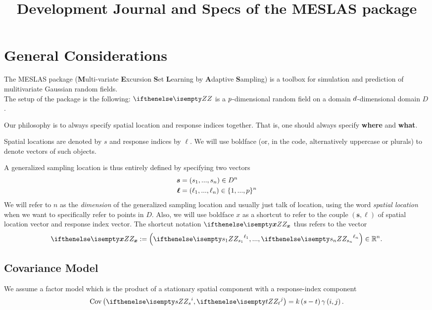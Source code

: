 \documentclass[a4paper,10pt]{article}
\title{Development Journal and Specs of the MESLAS package
}
\begin{document}
\maketitle

\section{General Considerations}
The MESLAS package (\textbf{M}ulti-variate \textbf{E}xcursion \textbf{S}et \textbf{L}earning by \textbf{A}daptive \textbf{S}ampling) is a toolbox for simulation and prediction of mulitivariate Gaussian random fields.\\

The setup of the package is the following: $\gp$ is a $p$-dimensional random
field on a domain $d$-dimensional
domain $D$.

Our philosophy is to always specify spatial location and response indices
together. That is, one should always specify \textbf{where} and \textbf{what}.

Spatial locations are denoted by $s$ and response indices by $\ell$. We will
use boldface (or, in the code, alternatively uppercase or plurals) to denote
vectors of such objects.

\medskip
A generalized sampling location is thus entirely defined by specifying two vectors
\begin{align*}
    \bm{s} &= \left(s_1, ..., s_n\right)\in D^n\\
    \bm{\ell} &= \left(\ell_1, ..., \ell_n\right) \in \lbrace 1, ..., p
    \rbrace^n
\end{align*}
We will refer to $n$ as the \textit{dimension} of the generalized sampling
location and usually just talk of location, using the word \textit{spatial
location} when we want to specifically refer to points in $D$. Also, we will
use boldface $x$ as a shortcut to refer to the couple $\left(\bm{s},
\bm{\ell}\right)$ of spatial location vector and response index vector.
The shortcut notation $\gp[\bm{x}]$ thus refers to the
vector
\[
    \gp[\bm{x}]:=\left(\gp[s_1]^{\ell_1}, ..., \gp[s_n]^{\ell_n}\right) \in
    \mathbb{R}^n.
\]

\subsection{Covariance Model}
We assume a factor model which is the product of a stationary spatial component
with a response-index component
\begin{equation}
    \textrm{Cov}\left(\gp[s]^i, \gp[t]^j\right) = k\left(s - t\right)
    \gamma\left(i, j\right).
\end{equation}
\end{document}
